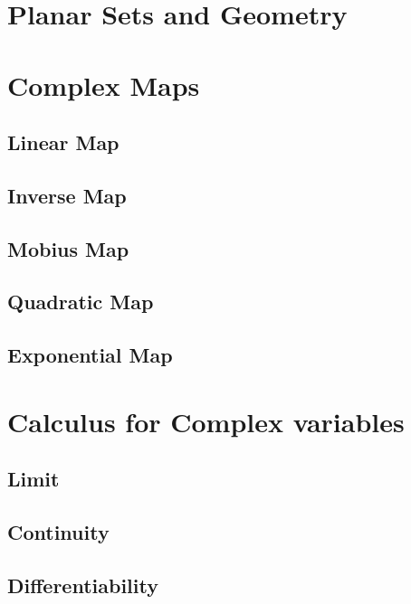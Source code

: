 \section{Planar Sets and Geometry}

\section{Complex Maps}

\subsection{Linear Map}

\subsection{Inverse Map}

\subsection{Mobius Map}

\subsection{Quadratic Map}

\subsection{Exponential Map}


\section{Calculus for Complex variables}

\subsection{Limit}

\subsection{Continuity}

\subsection{Differentiability}
